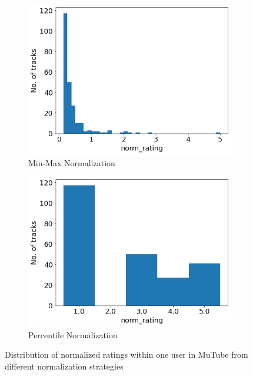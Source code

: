 \documentclass[a4paper,12pt]{report}
\begin{document}
\begin{figure}[btph]
    \begin{center}
        \begin{subfigure}{.48\textwidth}
            \centering
            \includegraphics[width= 1\linewidth]{./images/min_max_distribution.png}
            \vspace*{-5mm}
            \caption{Min-Max Normalization}
            \label{fig:min_max_normalization}
            \vspace*{2mm}
        \end{subfigure}
        \begin{subfigure}{.48\textwidth}
            \centering
            \includegraphics[width= 1\linewidth]{./images/percentile_distribution.png}
            \vspace*{-5mm}
            \caption{Percentile Normalization}
            \label{fig:percentile_normalization}
        \end{subfigure}
    \caption{Distribution of normalized ratings within one user in MuTube from different normalization strategies}
    \label{fig:Normalize_strategy_result}
    \end{center}
\end{figure}
\end{document}
